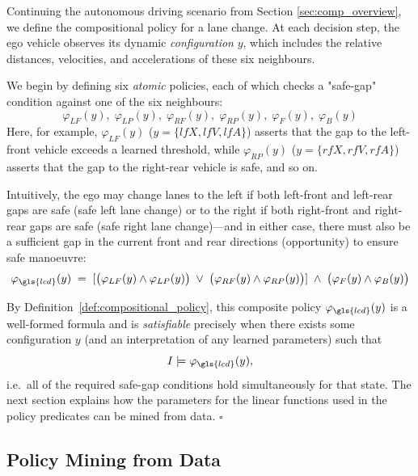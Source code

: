 \begin{example}
\label{example:compositional_policy_av}

Continuing the autonomous driving scenario from Section \ref{sec:comp_overview}, we define the compositional policy for a lane change. At each decision step, the ego vehicle observes its dynamic \emph{configuration} $y$, which includes the relative distances, velocities, and accelerations of these six neighbours.


We begin by defining six \emph{atomic} policies, each of which checks a "safe-gap" condition against one of the six neighbours:
\[
 \varphi_{LF}(y),\;
 \varphi_{LP}(y),\;
 \varphi_{RF}(y),\;
 \varphi_{RP}(y),\;
 \varphi_{F}(y),\;
 \varphi_{B}(y)
\]
Here, for example, $\varphi_{LF}(y)$ ($y=\{lfX, lfV, lfA\}$) asserts that the gap to the left-front vehicle exceeds a learned threshold, while $\varphi_{RP}(y)$ ($y=\{rfX, rfV, rfA\}$) asserts that the gap to the right-rear vehicle is safe, and so on.

Intuitively, the ego may change lanes to the left if both left-front and left-rear gaps are safe (safe left lane change) or to the right if both right-front and right-rear gaps are safe (safe right lane change)—and in either case, there must also be a sufficient gap in the current front and rear directions (opportunity) to ensure safe manoeuvre:
\begin{equation}
 \varphi_{\gls{lcd}}(y)
 \;=\;
 [\bigl(\varphi_{LF}(y)\land\varphi_{LP}(y)\bigr)
 \;\lor\;
 \bigl(\varphi_{RF}(y)\land\varphi_{RP}(y)\bigr)]
 \;\land\;
 \bigl(\varphi_{F}(y)\land\varphi_{B}(y)\bigr)
  \label{eq:phi_LCD}
\end{equation}

By Definition~\ref{def:compositional_policy}, this composite policy $\varphi_{\gls{lcd}}(y)$ is a well-formed formula and is \emph{satisfiable} precisely when there exists some configuration $y$ (and an interpretation of any learned parameters) such that
\[
 I \models \varphi_{\gls{lcd}}(y),
\]
i.e.\ all of the required safe-gap conditions hold simultaneously for that state. The next section explains how the parameters for the linear functions used in the policy predicates can be mined from data. $\square$
\end{example}






\subsection{Policy Mining from Data}
\label{sec:policy_mining}



